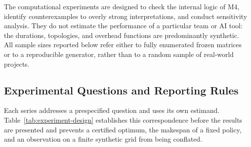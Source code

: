 \label{sec:computational-method}

The computational experiments are designed to check the internal logic of M4,
identify counterexamples to overly strong interpretations, and conduct
sensitivity analysis. They do not estimate the performance of a particular team
or AI tool: the durations, topologies, and overhead functions are predominantly
synthetic. All sample sizes reported below refer either to fully enumerated
frozen matrices or to a reproducible generator, rather than to a random sample
of real-world projects.

\subsection{Experimental Questions and Reporting Rules}

Each series addresses a prespecified question and uses its own estimand.
Table~\ref{tab:experiment-design} establishes this correspondence before the
results are presented and prevents a certified optimum, the makespan of a fixed
policy, and an observation on a finite synthetic grid from being conflated.

